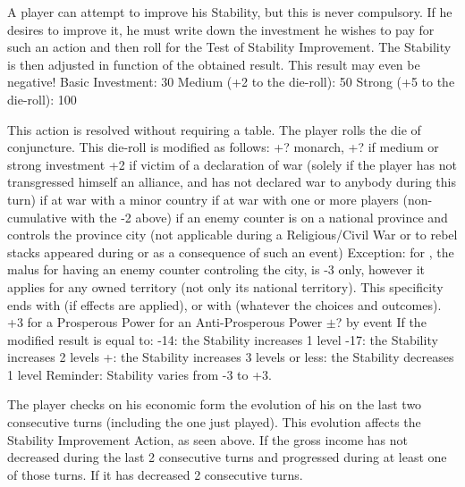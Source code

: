 \label{chPeace:Stability Improvement}
\aparag A player can attempt to improve his Stability, but this is never
compulsory. If he desires to improve it, he must write down the investment he
wishes to pay for such an action and then roll for the Test of Stability
Improvement. The Stability is then adjusted in function of the obtained
result. This result may even be negative!
\aparag[Investment]
\bparag Basic Investment: 30 \ducats
\bparag Medium (+2 to the die-roll): 50 \ducats
\bparag Strong (+5 to the die-roll): 100 \ducats

\aparag[Procedure]
This action is resolved without requiring a table.  The player rolls the die
of conjuncture. This die-roll is modified as follows:
\bparag +? \ADM monarch,
\bparag +? if medium or strong investment
\bparag +2 if victim of a declaration of war (solely if the player has not
transgressed himself an alliance, and has not declared war to anybody during
this turn)
 if at war with a minor country
 if at war with one or more players (non-cumulative with the -2
above)
 if an enemy \ARMY counter is on a national province and controls
the province city (not applicable during a Religious/Civil War or to rebel
stacks appeared during or as a consequence of such an event)
 Exception: for \SPA, the malus for having an enemy \ARMY counter
controling the city, is -3 only, however it applies for any owned territory
(not only its national territory).  This specificity ends
with  (if effects are applied), or with
 (whatever the choices and outcomes).
\bparag +3 for a Prosperous Power
 for an Anti-Prosperous Power
\bparag $\pm$? by event
\aparag[Result]
If the modified result is equal to:
-14: the Stability increases 1 level
-17: the Stability increases 2 levels
+: the Stability increases 3 levels
 or less: the Stability decreases 1 level
\bparag Reminder: Stability varies from -3 to +3.

\aparag[Prosperity]\label{chPeace:Prosperity}
The player checks on his economic form the evolution of his  on the last two consecutive turns (including the one just
played). This evolution affects the Stability Improvement Action, as seen
above.
If the gross income has not decreased during the last 2 consecutive turns and
progressed during at least one of those turns.
If it has decreased 2 consecutive turns.

